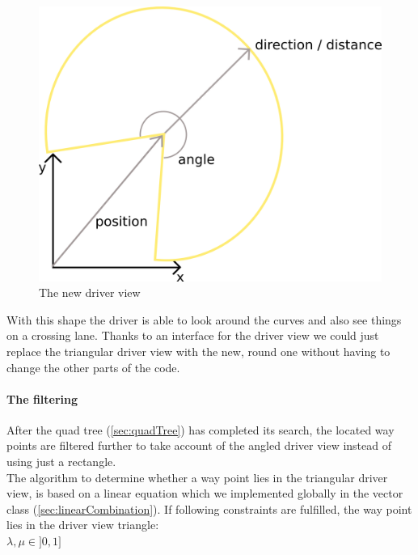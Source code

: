 \begin{figure}[H]
\begin{center}
\includegraphics[scale=0.4]{images/driverviewcircled.png}
\end{center}
\caption{The new driver view}
\label{fig:driverViewCircled}
\end{figure}

\noindent With this shape the driver is able to look around the curves
and also see things on a crossing lane. Thanks to an interface for the
driver view we could just replace the triangular driver view with the new,
round one without having to change the other parts of the code.

\paragraph{The filtering}

After the quad tree (\ref{sec:quadTree}) has completed its search, the
located way points are filtered further to take account of the angled
driver view instead of using just a rectangle. \\

The algorithm to determine whether a way point lies in the triangular
driver view, is based on a linear equation which we implemented globally
in the vector class (\ref{sec:linearCombination}). If following
constraints are fulfilled, the way point lies in the driver view
triangle: \\

$ \lambda, \mu \in ]0, 1]$ \\

